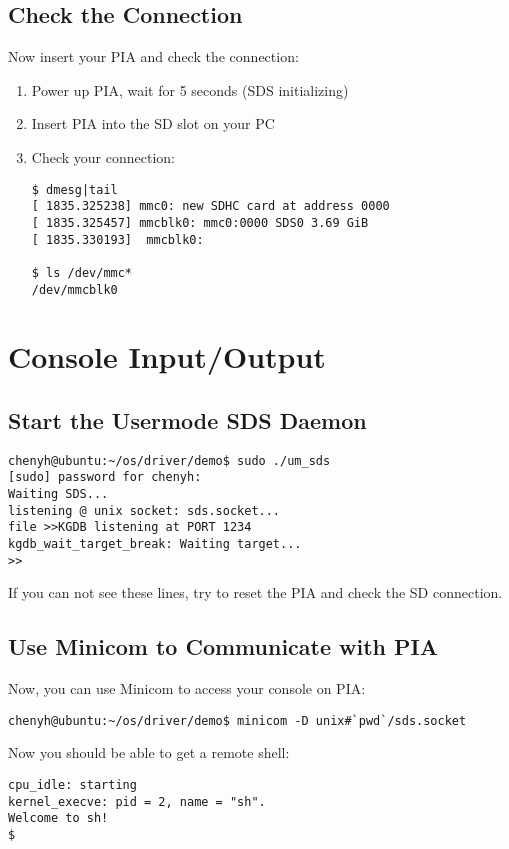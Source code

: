 \documentclass[a4paper]{article}
\begin{document}
\subsection{Check the Connection}
Now insert your PIA and check the connection:
\begin{enumerate}
  \item Power up PIA, wait for 5 seconds (SDS initializing)
  \item Insert PIA into the SD slot on your PC
  \item Check your connection:
    \begin{verbatim}
$ dmesg|tail
[ 1835.325238] mmc0: new SDHC card at address 0000
[ 1835.325457] mmcblk0: mmc0:0000 SDS0 3.69 GiB 
[ 1835.330193]  mmcblk0:

$ ls /dev/mmc*
/dev/mmcblk0
    \end{verbatim}

\end{enumerate}

\section{Console Input/Output}

\subsection{Start the Usermode SDS Daemon}

\begin{verbatim}
chenyh@ubuntu:~/os/driver/demo$ sudo ./um_sds 
[sudo] password for chenyh: 
Waiting SDS...
listening @ unix socket: sds.socket...
file >>KGDB listening at PORT 1234
kgdb_wait_target_break: Waiting target...
>>
\end{verbatim}

If you can not see these lines, try to reset the PIA and 
check the SD connection. 

\subsection{Use Minicom to Communicate with PIA}
Now, you can use Minicom to access your console on PIA:
\begin{verbatim}
chenyh@ubuntu:~/os/driver/demo$ minicom -D unix#`pwd`/sds.socket
\end{verbatim}

Now you should be able to get a remote shell:
\begin{verbatim}
cpu_idle: starting
kernel_execve: pid = 2, name = "sh".
Welcome to sh!
$                                   
\end{verbatim}
\end{document}
